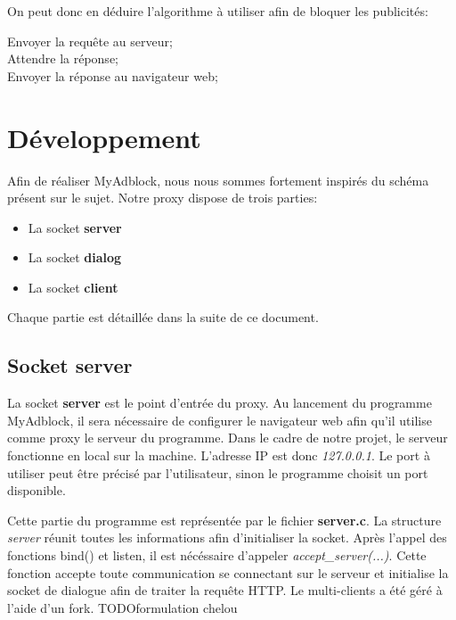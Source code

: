 \documentclass[a4paper,11pt, oneside]{book}
\def\appName{MyAdblock}
\def\todo{{\color{red}\Huge{TODO}}}
\begin{document}
		\clearpage
		On peut donc en déduire l'algorithme à utiliser afin de bloquer les publicités:\\

		\begin{algorithm}[H]
			{
				Envoyer la requête au serveur;\\
				Attendre la réponse;\\
				Envoyer la réponse au navigateur web;
			}
		\end{algorithm}


		\chapter{Développement}

			Afin de réaliser \appName, nous nous sommes fortement inspirés du schéma présent sur le sujet.
			Notre proxy dispose de trois parties:
			\begin{itemize}
				\item La socket \textbf{server}
				\item La socket \textbf{dialog}
				\item La socket \textbf{client}
			\end{itemize}

			Chaque partie est détaillée dans la suite de ce document.


		\section{Socket server}

			La socket \textbf{server} est le point d'entrée du proxy. Au lancement du programme \appName,
			il sera nécessaire de configurer le navigateur web afin qu'il utilise comme proxy le serveur du programme.
			Dans le cadre de notre projet, le serveur fonctionne en local sur la machine. L'adresse IP est donc \textit{127.0.0.1}. Le port
			à utiliser peut être précisé par l'utilisateur, sinon le programme choisit un port disponible.

			Cette partie du programme est représentée par le fichier \textbf{server.c}. La structure \textit{server} réunit toutes les informations
			afin d'initialiser la socket. Après l'appel des fonctions bind() et listen, il est nécéssaire
			d'appeler \textit{accept\_server(...)}. Cette fonction accepte toute communication se connectant sur le serveur
			et initialise la socket de dialogue afin de traiter la requête HTTP. Le multi-clients a été géré à l'aide d'un fork. \todo formulation chelou
\end{document}
